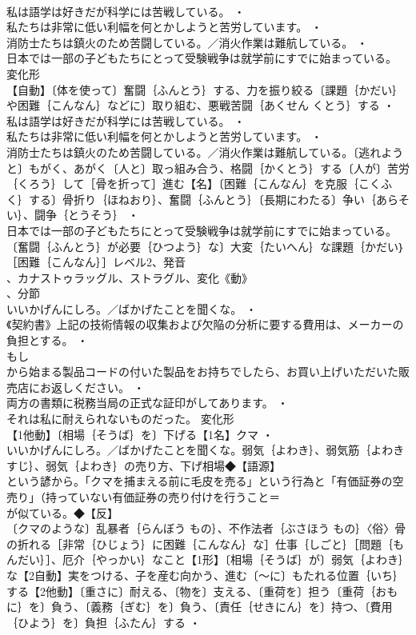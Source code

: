 \documentclass[8pt]{extreport}
\begin{document}
\begin{CJK}{UTF8}{min}
\\	私は語学は好きだが科学には苦戦している。 ・
\\	私たちは非常に低い利幅を何とかしようと苦労しています。 ・
\\	消防士たちは鎮火のため苦闘している。／消火作業は難航している。 ・
\\	日本では一部の子どもたちにとって受験戦争は就学前にすでに始まっている。	変化形 
\\	【自動】〔体を使って〕奮闘｛ふんとう｝する、力を振り絞る〔課題｛かだい｝や困難｛こんなん｝などに〕取り組む、悪戦苦闘｛あくせん くとう｝する ・
\\	私は語学は好きだが科学には苦戦している。 ・
\\	私たちは非常に低い利幅を何とかしようと苦労しています。 ・
\\	消防士たちは鎮火のため苦闘している。／消火作業は難航している。〔逃れようと〕もがく、あがく〔人と〕取っ組み合う、格闘｛かくとう｝する〔人が〕苦労｛くろう｝して［骨を折って］進む【名】〔困難｛こんなん｝を克服｛こくふく｝する〕骨折り｛ほねおり｝、奮闘｛ふんとう｝〔長期にわたる〕争い｛あらそい｝、闘争｛とうそう｝ ・
\\	日本では一部の子どもたちにとって受験戦争は就学前にすでに始まっている。〔奮闘｛ふんとう｝が必要｛ひつよう｝な〕大変｛たいへん｝な課題｛かだい｝［困難｛こんなん｝］レベル2、発音
\\	、カナストゥラッグル、ストラグル、変化《動》
\\	、分節
\\	いいかげんにしろ。／ばかげたことを聞くな。 ・
\\	《契約書》上記の技術情報の収集および欠陥の分析に要する費用は、メーカーの負担とする。 ・
\\	もし
\\	から始まる製品コードの付いた製品をお持ちでしたら、お買い上げいただいた販売店にお返しください。 ・
\\	両方の書類に税務当局の正式な証印がしてあります。 ・
\\	それは私に耐えられないものだった。	変化形 
\\	【1他動】〔相場｛そうば｝を〕下げる【1名】クマ ・
\\	いいかげんにしろ。／ばかげたことを聞くな。弱気｛よわき｝、弱気筋｛よわきすじ｝、弱気｛よわき｝の売り方、下げ相場◆【語源】
\\	という諺から。「クマを捕まえる前に毛皮を売る」という行為と「有価証券の空売り」（持っていない有価証券の売り付けを行うこと＝
\\	が似ている。◆【反】
\\	〔クマのような〕乱暴者｛らんぼう もの｝、不作法者｛ぶさほう もの｝〈俗〉骨の折れる［非常｛ひじょう｝に困難｛こんなん｝な］仕事｛しごと｝［問題｛もんだい｝］、厄介｛やっかい｝なこと【1形】〔相場｛そうば｝が〕弱気｛よわき｝な【2自動】実をつける、子を産む向かう、進む〔～に〕もたれる位置｛いち｝する【2他動】〔重さに〕耐える、〔物を〕支える、〔重荷を〕担う〔重荷｛おもに｝を〕負う、〔義務｛ぎむ｝を〕負う、〔責任｛せきにん｝を〕持つ、〔費用｛ひよう｝を〕負担｛ふたん｝する ・

\end{CJK}
\end{document}
